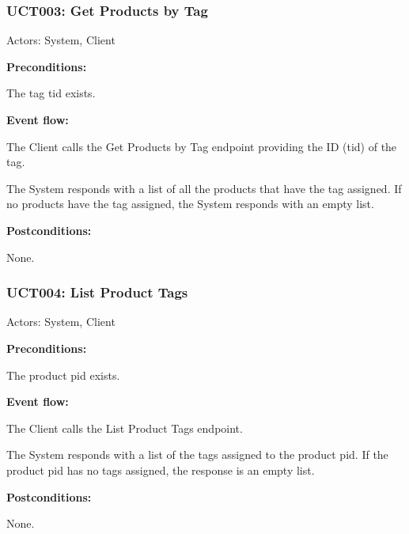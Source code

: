 \begin{ucbox}{\subsubsection{UCT003: Get Products by Tag}}
\label{UCT003}

Actors: System, Client

\textbf{Preconditions:}

\ucitem The tag tid exists.

\textbf{Event flow:}

\ucitem The Client calls the Get Products by Tag endpoint providing the ID (tid) of the tag.

\ucitem The System responds with a list of all the products that have the tag assigned. If no products have the tag assigned, the System responds with an empty list.

\textbf{Postconditions:}

\ucitem None.

\end{ucbox}

\begin{ucbox}{\subsubsection{UCT004: List Product Tags}}
\label{UCT004}

Actors: System, Client

\textbf{Preconditions:}

\ucitem The product pid exists.

\textbf{Event flow:}

\ucitem The Client calls the List Product Tags endpoint.

\ucitem The System responds with a list of the tags assigned to the product pid. If the product pid has no tags assigned, the response is an empty list.

\textbf{Postconditions:}

\ucitem None.

\end{ucbox}
\newpage